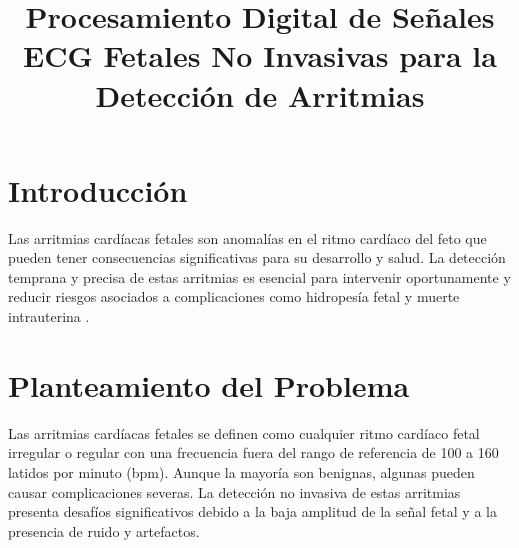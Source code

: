 \documentclass[10pt, conference]{IEEEtran}
\begin{document}
\onehalfspacing %

\title{Procesamiento Digital de Señales ECG Fetales No Invasivas para la Detección de Arritmias}

\author{
	\and
}

\maketitle


\section{Introducción}

Las arritmias cardíacas fetales son anomalías en el ritmo cardíaco del feto que pueden tener consecuencias significativas para su desarrollo y salud. La detección temprana y precisa de estas arritmias es esencial para intervenir oportunamente y reducir riesgos asociados a complicaciones como hidropesía fetal y muerte intrauterina \cite{behar2019noninvasive}.

\section{Planteamiento del Problema}

Las arritmias cardíacas fetales se definen como cualquier ritmo cardíaco fetal irregular o regular con una frecuencia fuera del rango de referencia de 100 a 160 latidos por minuto (bpm). Aunque la mayoría son benignas, algunas pueden causar complicaciones severas. La detección no invasiva de estas arritmias presenta desafíos significativos debido a la baja amplitud de la señal fetal y a la presencia de ruido y artefactos.
\end{document}
